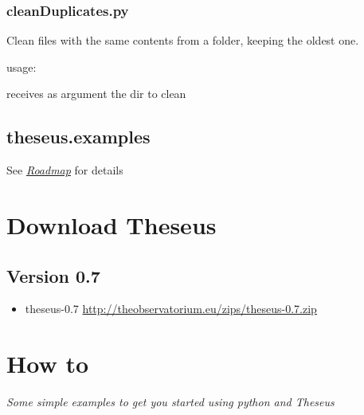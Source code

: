 \documentclass[letterpaper,10pt,english]{sphinxmanual}
\begin{document}
\label{theseus:module-theseus.utils.cleanDuplicates}

\subsubsection{cleanDuplicates.py}
\label{theseus:cleanduplicates-py}
Clean files with the same contents from a folder, keeping the oldest one.

usage: 

\begin{fulllineitems}
\label{theseus:theseus.utils.cleanDuplicates.main}
receives as argument the dir to clean

\end{fulllineitems}



\subsection{theseus.examples}
\label{theseus:theseus-examples}\label{theseus:module-theseus.examples}
See {\hyperref[TODO::doc]{\emph{Roadmap}}} for details


\section{Download Theseus}
\label{download::doc}\label{download:download-theseus}

\subsection{Version 0.7}
\label{download:version-0-7}\begin{itemize}
\item {} 
theseus-0.7 \href{http://theobservatorium.eu/zips/theseus-0.7.zip}{http://theobservatorium.eu/zips/theseus-0.7.zip}

\end{itemize}


\section{How to}
\label{howto::doc}\label{howto:how-to}
\emph{Some simple examples to get you started using python and Theseus}
\end{document}
